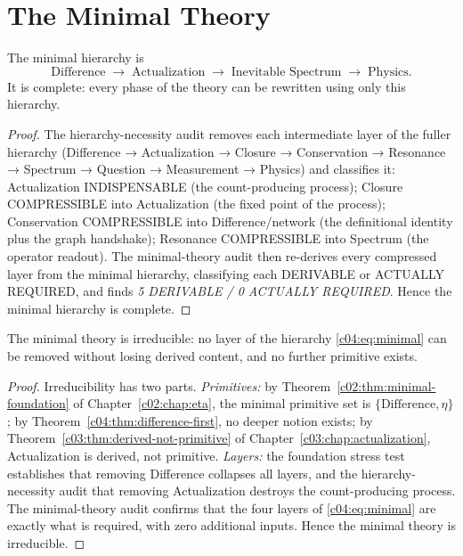 \section{The Minimal Theory}
\label{c04:sec:minimal-theory}

\begin{theorem}
\label{c04:thm:minimal-hierarchy}
The minimal hierarchy is
\[
\text{Difference}\;\longrightarrow\;\text{Actualization}\;\longrightarrow\;\text{Inevitable Spectrum}\;\longrightarrow\;\text{Physics}.
\]
It is complete: every phase of the theory can be rewritten using only this hierarchy.
\end{theorem}

\begin{proof}
The hierarchy-necessity audit \cite{c04:QG293} removes each intermediate layer of the fuller
hierarchy (Difference → Actualization → Closure → Conservation → Resonance → Spectrum →
Question → Measurement → Physics) and classifies it: Actualization INDISPENSABLE (the
count-producing process); Closure COMPRESSIBLE into Actualization (the fixed point of the
process); Conservation COMPRESSIBLE into Difference/network (the definitional identity plus
the graph handshake); Resonance COMPRESSIBLE into Spectrum (the operator readout). The
minimal-theory audit \cite{c04:QG294} then re-derives every compressed layer from the minimal
hierarchy, classifying each DERIVABLE or ACTUALLY REQUIRED, and finds
\emph{5 DERIVABLE / 0 ACTUALLY REQUIRED}. Hence the minimal hierarchy is complete.
\end{proof}

\begin{theorem}
\label{c04:thm:minimal-irreducible}
The minimal theory is irreducible: no layer of the hierarchy
\eqref{c04:eq:minimal} can be removed without losing derived content, and no further primitive
exists.
\end{theorem}

\begin{proof}
Irreducibility has two parts. \emph{Primitives:} by Theorem~\ref{c02:thm:minimal-foundation} of
Chapter~\ref{c02:chap:eta}, the minimal primitive set is $\{\text{Difference},\eta\}$; by
Theorem~\ref{c04:thm:difference-first}, no deeper notion exists; by
Theorem~\ref{c03:thm:derived-not-primitive} of Chapter~\ref{c03:chap:actualization}, Actualization
is derived, not primitive. \emph{Layers:} the foundation stress test \cite{c04:QG292}
establishes that removing Difference collapses all layers, and the hierarchy-necessity audit
\cite{c04:QG293} that removing Actualization destroys the count-producing process.
The minimal-theory audit \cite{c04:QG294} confirms that the four layers of \eqref{c04:eq:minimal}
are exactly what is required, with zero additional inputs. Hence the minimal theory is
irreducible.
\end{proof}

